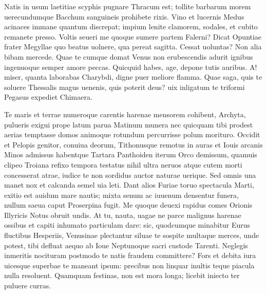 \documentclass{book}
\newenvironment {carmen} [1] [\relax] 
  {\Titulus \Versus \incipit*\numerus{1}#1}
  {\endVersus}
\newcommand {\Alcaic}    {\Forma \strophae {0 \poena 01 \poena 2}}
\newcommand {\Alcm}      {\Forma \strophae {0 \poena 2}}
\begin{document}
\begin{carmen}[\Alcaic]


 Natis in usum laetitiae scyphis
 pugnare Thracum est; tollite barbarum
      morem uerecundumque Bacchum
      sanguineis prohibete rixis.
 Vino et lucernis Medus acinaces               
 immane quantum discrepat; impium
      lenite clamorem, sodales,
      et cubito remanete presso.
 Voltis seueri me quoque sumere
 partem Falerni? Dicat Opuntiae               
      frater Megyllae quo beatus
      uolnere, qua pereat sagitta.
 Cessat uoluntas? Non alia bibam
 mercede. Quae te cumque domat Venus
       non erubescendis adurit
      ignibus ingenuoque semper               
 amore peccas. Quicquid habes, age,
 depone tutis auribus. A! miser,
      quanta laborabas Charybdi,
       digne puer meliore flamma.               
 Quae saga, quis te soluere Thessalis
 magus uenenis, quis poterit deus?
      uix inligatum te triformi
      Pegasus expediet Chimaera. 

\end{carmen}

\begin{carmen}[\Alcm]


 Te maris et terrae numeroque carentis harenae
      mensorem cohibent, Archyta,
 pulueris exigui prope latum parua Matinum
      munera nec quicquam tibi prodest
 aerias temptasse domos animoque rotundum               
      percurrisse polum morituro.
 Occidit et Pelopis genitor, conuiua deorum,
      Tithonusque remotus in auras
 et Iouis arcanis Minos admissus habentque
       Tartara Panthoiden iterum Orco               
 demissum, quamuis clipeo Troiana refixo
      tempora testatus nihil ultra
 neruos atque cutem morti concesserat atrae,
      iudice te non sordidus auctor
 naturae uerique. Sed omnis una manet nox               
      et calcanda semel uia leti.
 Dant alios Furiae toruo spectacula Marti,
      exitio est auidum mare nautis;
 mixta senum ac iuuenum densentur funera, nullum
       saeua caput Proserpina fugit.               
 Me quoque deuexi rapidus comes Orionis
      Illyricis Notus obruit undis.
 At tu, nauta, uagae ne parce malignus harenae
      ossibus et capiti inhumato
 particulam dare: sic, quodcumque minabitur Eurus               
      fluctibus Hesperiis, Venusinae
 plectantur siluae te sospite multaque merces,
      unde potest, tibi defluat aequo
 ab Ioue Neptunoque sacri custode Tarenti.
       Neglegis inmeritis nocituram
 postmodo te natis fraudem committere? Fors et               
      debita iura uicesque superbae
 te maneant ipsum: precibus non linquar inultis
      teque piacula nulla resoluent.
 Quamquam festinas, non est mora longa; licebit               
      iniecto ter puluere curras. 

\end{carmen}
\end{document}
